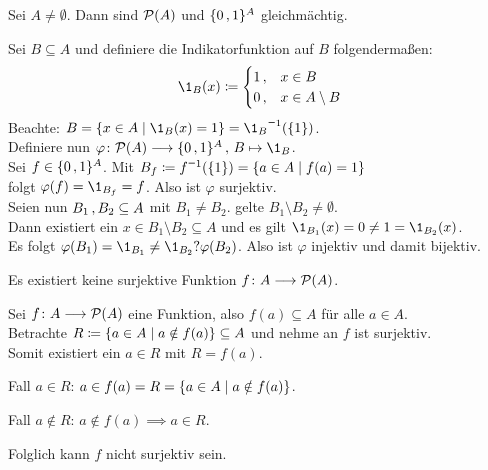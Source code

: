 \documentclass[../ana1.tex]{subfiles}
\begin{document}
\begin{lem}\label{satz:bij_pow}
	Sei \(A \neq \emptyset \). Dann sind \( \mathcal{P}(A) \) und \(\{0 \operatorname{,} 1\}^A \) gleichmächtig.
\end{lem}
\begin{bew}
	Sei \(B \subseteq A \) und definiere die Indikatorfunktion auf \(B \) folgendermaßen:
	\[ \1_B(x) \coloneqq \begin{cases}
			1 \ko & x \in B \\
			0 \ko & x \in A \setminus B
		\end{cases}\]
	Beachte: \(B = \set{x \in A \; | \; \1_B(x) = 1 } = \inverse{\1_B}(\set{1}) \). \\
	Definiere nun \( \varphi \colon \PO(A) \longrightarrow \set{0 \ko 1}^A \ko \, B \mapsto \1_B \). \\
	Sei \(f \in \{0 \operatorname{,} 1\}^A \). Mit \(B_f \coloneqq \inverse{f}(\set{1}) = \set{a \in A \; \vert \; f(a) = 1} \) \\
	folgt \(\varphi(f) = \1_{B_f} = f \). Also ist \(\varphi \) surjektiv. \\
	Seien nun \(B_1 \operatorname{,} B_2 \subseteq A \) mit \(B_1 \neq B_2 \). \obda gelte \(B_1 \setminus B_2 \neq \emptyset \). \\
	Dann existiert ein \(x \in B_1 \setminus B_2 \subseteq A \) und es gilt \(\1_{B_1}(x) = 0 \neq 1 = \1_{B_2}(x) \). \\
	Es folgt \(\varphi(B_1) = \1_{B_1} \neq \1_{B_2} ? \varphi(B_2) \). Also ist \(\varphi \) injektiv und damit bijektiv.
\end{bew}

\begin{lem}
	Es existiert keine surjektive Funktion \(f \colon A \longrightarrow \mathcal{P}(A) \).
\end{lem}
\begin{bew}
	Sei \(f \colon A \longrightarrow \mathcal{P}(A) \) eine Funktion, also \(f(a) \subseteq A \) für alle \(a \in A \). \\
	Betrachte \(R \coloneqq \{a \in A \; \vert \; a \notin f(a)\} \subseteq A \) und nehme an \(f \)  ist surjektiv. \\
	Somit existiert ein \(a \in R \) mit \(R = f(a)\).
	\begin{faelle}
		\item[Fall \(a \in R \):] \(a \in f(a) = R =  \{a \in A \; \vert \; a \notin f(a)\} \). \Lightning{}
		\item[Fall \(a \notin R\):] \(a \notin f(a) \implies a \in R \). \Lightning{} 
	\end{faelle}
	Folglich kann \(f \) nicht surjektiv sein.
\end{bew}

\end{document}

